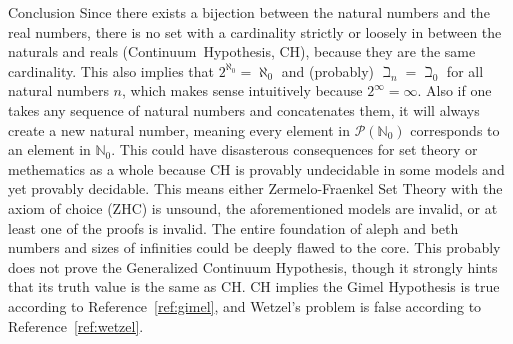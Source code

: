 \documentclass[12pt]{article}
\begin{document}
\begin{section}{Conclusion}\label{sec:conclusion}
	Since there exists a bijection between the natural numbers and the real numbers, there is no set
	with a cardinality strictly or loosely in between the naturals and reals (Continuum~Hypothesis,
	CH), because they are the same cardinality. This also implies that $2^{\aleph_0}=\aleph_0$ and
	(probably) $\beth_n=\beth_0$ for all natural numbers $n$, which makes sense intuitively because
	$2^\infty=\infty$. Also if one takes any sequence of natural numbers and concatenates them, it
	will always create a new natural number, meaning every element in $\mathcal P(\mathbb N_0)$
	corresponds to an element in $\mathbb N_0$. This could have disasterous consequences for set
	theory or methematics as a whole because CH is provably undecidable in some models and yet
	provably decidable. This means either Zermelo-Fraenkel Set Theory with the axiom of choice (ZHC)
	is unsound, the aforementioned models are invalid, or at least one of the proofs is invalid. The
	entire foundation of aleph and beth numbers and sizes of infinities could be deeply flawed to
	the core. This probably does not prove the Generalized Continuum Hypothesis, though it strongly
	hints that its truth value is the same as CH. CH implies the Gimel Hypothesis is true according
	to Reference~\ref{ref:gimel}, and Wetzel's problem is false according to Reference~\ref{ref:wetzel}.
\end{section}
\end{document}
